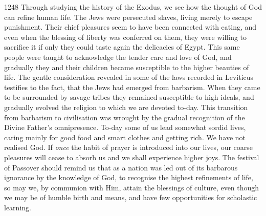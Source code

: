 \begin{tp}{1248}
Through studying the history of the
Exodus, we see how the thought of God
can refine human life. The Jews were
persecuted slaves, living merely to escape
punishment. Their chief pleasures seem to
have been connected with eating, and even
when the blessing of liberty was conferred
on them, they were willing to sacrifice it if
only they could taste again the delicacies of
Egypt. This same people were taught to
acknowledge the tender care and love of
God, and gradually they and their children
became susceptible to the higher beauties of
life. The gentle consideration revealed in
some of the laws recorded in Leviticus
testifies to the fact, that the Jews had
emerged from barbarism. When they came
to be surrounded by savage tribes they
remained susceptible to high ideals, and gradually
evolved the religion to which we are
devoted to-day. This transition from barbarism
to civilisation was wrought by the
gradual recognition of the Divine Father's
omnipresence. To-day some of us lead somewhat
sordid lives, caring mainly for good
food and smart clothes and getting rich. We
have not realised God. If \textsl{once} the habit of
prayer is introduced into our lives, our coarse
pleasures will cease to absorb us and we
shall experience higher joys. The festival
of Passover should remind us that as a
nation was led out of its barbarous ignorance
by the knowledge of God, to recognise the
highest refinements of life, so may we, by
communion with Him, attain the blessings
of culture, even though we may be of humble
birth and means, and have few opportunities
for scholastic learning.
\end{tp}

